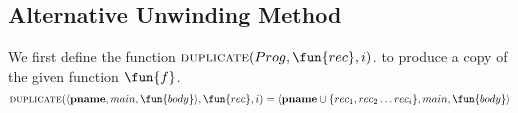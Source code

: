 \subsection{Alternative Unwinding Method}\label{subsec:new-unwinding}
We first define the function \(\textsc{duplicate}(Prog, \fun{rec},i)\). to produce a copy of the given function $\fun{f}$.
\begin{equation*}
  \textsc{duplicate}(\langle \mathbf{pname},main,\fun{body}\rangle, \fun{rec},i)
    = \langle \mathbf{pname}\cup\{rec_1, rec_2\dotsc rec_i\},main,\fun{body}\rangle
\end{equation*}
